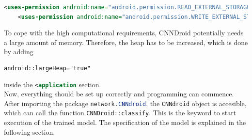 \begin{lstlisting}[language=XML, basicstyle=\scriptsize]
    <uses-permission android:name="android.permission.READ_EXTERNAL_STORAGE"/>
    <uses-permission android:name="android.permission.WRITE_EXTERNAL_STORAGE"/>
\end{lstlisting}

To cope with the high computational requirements, CNNDroid potentially needs a large amount of memory. Therefore, the heap has to be increased, which is done by adding

\begin{lstlisting}[language=XML, basicstyle=\scriptsize]
    android::largeHeap="true"
\end{lstlisting}
\noindent
inside the \lstinline[language=XML]{<application} section.\\
Now, everything should be set up correctly and programming can commence.\\
After importing the package \lstinline[language=Java]{network.CNNdroid}, the \lstinline[language=Java]{CNNdroid} object is accesible, which can call the function \lstinline[language=Java]{CNNDroid::classify}. This is the keyword to start execution of the trained model. The specification of the model is explained in the following section.

